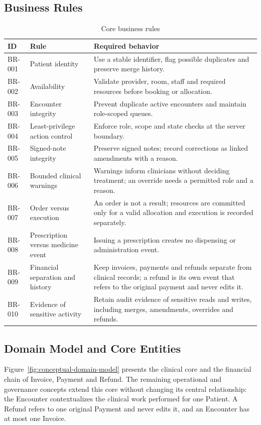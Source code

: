 \documentclass[a4paper,12pt]{article}
\begin{document}
\subsection{Business Rules}
\begin{table}[H]
\centering
\scriptsize
\renewcommand{\arraystretch}{1.14}
\begin{tabularx}{\textwidth}{@{}P{0.12\textwidth}P{0.28\textwidth}Y@{}}
\toprule
ID & Rule & Required behavior \\
\midrule
BR-001 & Patient identity & Use a stable identifier, flag possible duplicates and preserve merge history. \\
BR-002 & Availability & Validate provider, room, staff and required resources before booking or allocation. \\
BR-003 & Encounter integrity & Prevent duplicate active encounters and maintain role-scoped queues. \\
BR-004 & Least-privilege action control & Enforce role, scope and state checks at the server boundary. \\
BR-005 & Signed-note integrity & Preserve signed notes; record corrections as linked amendments with a reason. \\
BR-006 & Bounded clinical warnings & Warnings inform clinicians without deciding treatment; an override needs a permitted role and a reason. \\
BR-007 & Order versus execution & An order is not a result; resources are committed only for a valid allocation and execution is recorded separately. \\
BR-008 & Prescription versus medicine event & Issuing a prescription creates no dispensing or administration event. \\
BR-009 & Financial separation and history & Keep invoices, payments and refunds separate from clinical records; a refund is its own event that refers to the original payment and never edits it. \\
BR-010 & Evidence of sensitive activity & Retain audit evidence of sensitive reads and writes, including merges, amendments, overrides and refunds. \\
\bottomrule
\end{tabularx}
\caption{Core business rules}
\label{tab:business-rules}
\end{table}

\subsection{Domain Model and Core Entities}
Figure~\ref{fig:conceptual-domain-model} presents the clinical core and the financial chain of Invoice, Payment and Refund. The remaining operational and governance concepts extend this core without changing its central relationship: the Encounter contextualizes the clinical work performed for one Patient. A Refund refers to one original Payment and never edits it, and an Encounter has at most one Invoice.
\end{document}
